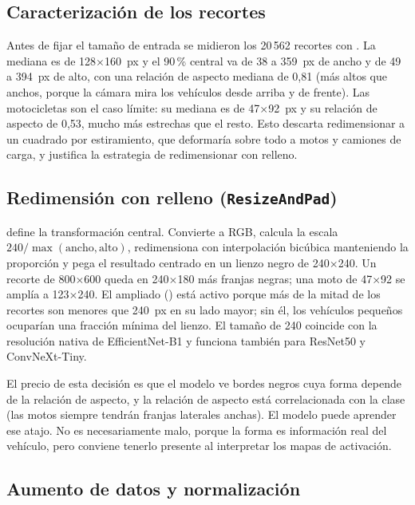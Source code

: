 \documentclass[11pt,a4paper]{article}
\begin{document}
\subsection{Caracterización de los recortes}

Antes de fijar el tamaño de entrada se midieron los 20\,562 recortes con . La mediana es de 128$\times$160~px y el 90\,\% central va de 38 a 359~px de ancho y de 49 a 394~px de alto, con una relación de aspecto mediana de 0,81 (más altos que anchos, porque la cámara mira los vehículos desde arriba y de frente). Las motocicletas son el caso límite: su mediana es de 47$\times$92~px y su relación de aspecto de 0,53, mucho más estrechas que el resto. Esto descarta redimensionar a un cuadrado por estiramiento, que deformaría sobre todo a motos y camiones de carga, y justifica la estrategia de redimensionar con relleno.

\subsection{Redimensión con relleno (\texorpdfstring{\texttt{ResizeAndPad}}{ResizeAndPad})}

 define la transformación central. Convierte a RGB, calcula la escala $240 / \max(\text{ancho}, \text{alto})$, redimensiona con interpolación bicúbica manteniendo la proporción y pega el resultado centrado en un lienzo negro de 240$\times$240. Un recorte de 800$\times$600 queda en 240$\times$180 más franjas negras; una moto de 47$\times$92 se amplía a 123$\times$240. El ampliado () está activo porque más de la mitad de los recortes son menores que 240~px en su lado mayor; sin él, los vehículos pequeños ocuparían una fracción mínima del lienzo. El tamaño de 240 coincide con la resolución nativa de EfficientNet-B1 y funciona también para ResNet50 y ConvNeXt-Tiny.

El precio de esta decisión es que el modelo ve bordes negros cuya forma depende de la relación de aspecto, y la relación de aspecto está correlacionada con la clase (las motos siempre tendrán franjas laterales anchas). El modelo puede aprender ese atajo. No es necesariamente malo, porque la forma es información real del vehículo, pero conviene tenerlo presente al interpretar los mapas de activación.

\subsection{Aumento de datos y normalización}
\end{document}
